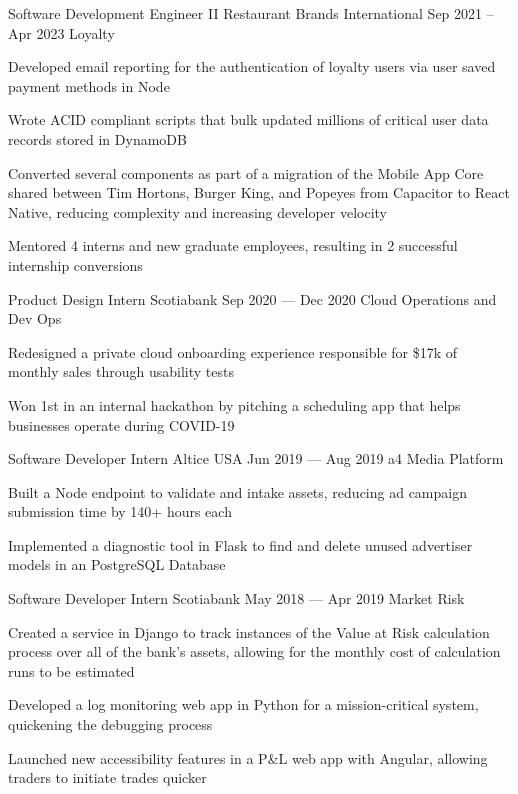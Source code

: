 \begin{cventries}
  \cventry
      {Software Development Engineer II}
      {Restaurant Brands International}
      {}
      {Sep 2021 -- Apr 2023}
      {Loyalty}
      {
        \begin{cvitems}
          \item {Developed email reporting for the authentication of loyalty users via user saved payment methods in Node}
          \item {Wrote ACID compliant scripts that bulk updated millions of critical user data records stored in DynamoDB}
          \item {Converted several components as part of a migration of the Mobile App Core shared between Tim Hortons, Burger King, and Popeyes from Capacitor to React Native, reducing complexity and increasing developer velocity}
          \item {Mentored 4 interns and new graduate employees, resulting in 2 successful internship conversions}
        \end{cvitems}
      }
  \cventry
    {Product Design Intern}
    {Scotiabank}
    {}
    {Sep 2020 --- Dec 2020}
    {Cloud Operations and Dev Ops}
    {
      \begin{cvitems}
        \item {Redesigned a private cloud onboarding experience responsible for \$17k of monthly sales through usability tests}
        \item {Won 1st in an internal hackathon by pitching a scheduling app that helps businesses operate during COVID-19}
      \end{cvitems}
    }

  \cventry
    {Software Developer Intern}
    {Altice USA}
    {}
    {Jun 2019 --- Aug 2019}
    {a4 Media Platform}
    {
    \begin{cvitems}
      \item {Built a Node endpoint to validate and intake assets, reducing ad campaign submission time by 140+ hours each}
      \item {Implemented a diagnostic tool in Flask to find and delete unused advertiser models in an PostgreSQL Database}
    \end{cvitems}
    }

  \cventry
    {Software Developer Intern}
    {Scotiabank}
    {}
    {May 2018 --- Apr 2019}
    {Market Risk}
    {
      \begin{cvitems}
        \item {Created a service in Django to track instances of the Value at Risk calculation process over all of the bank's assets, allowing for the monthly cost of calculation runs to be estimated}
        \item {Developed a log monitoring web app in Python for a mission-critical system, quickening the debugging process}
        \item {Launched new accessibility features in a P\&L web app with Angular, allowing traders to initiate trades quicker}
      \end{cvitems}
    }
\end{cventries}
